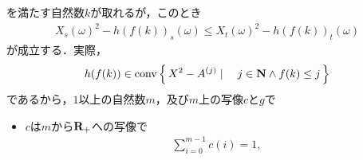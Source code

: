 \begin{sketch}
\begin{description}
				を満たす自然数$k$が取れるが，このとき
				\begin{align}
					{X_{s}(\omega)}^{2} - h(f(k))_{s}(\omega)
					\leq {X_{t}(\omega)}^{2} - h(f(k))_{t}(\omega)
					\label{fom:thm_decomposition_of_local_martingales_1}
				\end{align}
				が成立する．実際，
				\begin{align}
					h(f(k)) \in \operatorname*{conv} \left\{\, X^{2} - A^{(j)} \mid \quad j \in \mathbf{N} \wedge f(k) \leq j\, \right\}
				\end{align}
				であるから，$1$以上の自然数$m$，及び$m$上の写像$c$と$g$で
				\begin{itemize}
					\item $c$は$m$から$\mathbf{R}_{+}$への写像で
						\begin{align}
							\sum_{i=0}^{m-1} c(i) = 1,
						\end{align}
						

\end{itemize}
\end{description}
\end{sketch}
